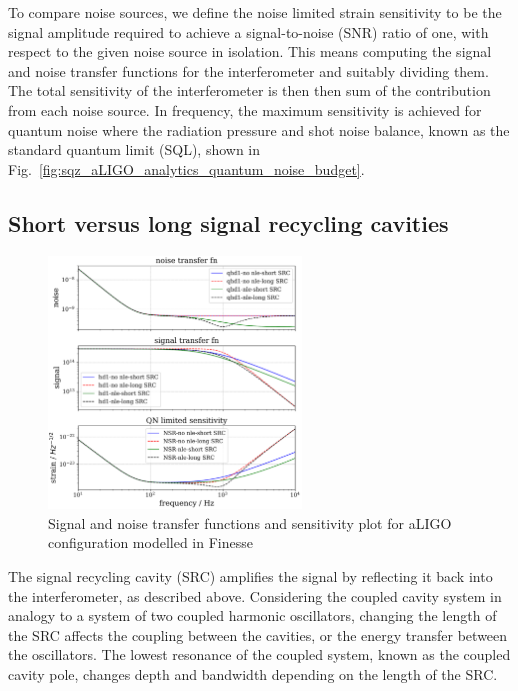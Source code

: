 \documentclass[aps,pra,superscriptaddress,reprint,nofootinbib]{revtex4-1}
\begin{document}
To compare noise sources, we define the noise limited strain sensitivity to be the signal amplitude required to achieve a signal-to-noise (SNR) ratio of one, with respect to the given noise source in isolation. This means computing the signal and noise transfer functions for the interferometer and suitably dividing them. The total sensitivity of the interferometer is then then sum of the contribution from each noise source.
In frequency, the maximum sensitivity is achieved for quantum noise where the radiation pressure and shot noise balance, known as the standard quantum limit (SQL), shown in Fig.~\ref{fig:sqz_aLIGO_analytics_quantum_noise_budget}.	


\subsection{Short versus long signal recycling cavities}
\label{sec:long_srcs}

\begin{figure}
	\begin{center}
	\includegraphics[width=0.6\textwidth]{figures/aLIGO_transfer_fns_and_sensitivity_comparison.pdf}
	\end{center}
	\caption{Signal and noise transfer functions and sensitivity plot for aLIGO configuration modelled in Finesse}
	\label{fig:src_transfer_functions}
\end{figure}

The signal recycling cavity (SRC) amplifies the signal by reflecting it back into the interferometer, as described above.
Considering the coupled cavity system in analogy to a system of two coupled harmonic oscillators, changing the length of the SRC affects the coupling between the cavities, or the energy transfer between the oscillators. The lowest resonance of the coupled system, known as the coupled cavity pole, changes depth and bandwidth depending on the length of the SRC.
\end{document}
